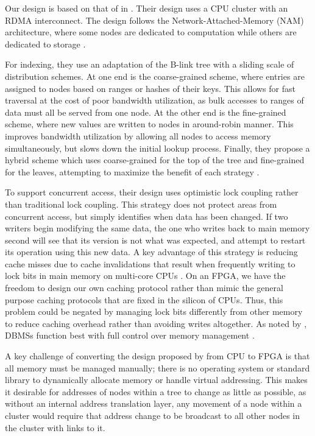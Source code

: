 

Our design is based on that of \citeauthor{base} in . Their
design uses a CPU cluster with an RDMA interconnect. The design follows the
Network-Attached-Memory (NAM) architecture, where some nodes are dedicated to
computation while others are dedicated to storage
\autocite{base,binnig-vldb-2016}.

For indexing, they use an adaptation of the B-link tree with a sliding scale of
distribution schemes. At one end is the coarse-grained scheme, where entries are
assigned to nodes based on ranges or hashes of their keys. This allows for fast
traversal at the cost of poor bandwidth utilization, as bulk accesses to ranges
of data must all be served from one node. At the other end is the fine-grained
scheme, where new values are written to nodes in around-robin manner. This
improves bandwidth utilization by allowing all nodes to access memory
simultaneously, but slows down the initial lookup process. Finally, they propose
a hybrid scheme which uses coarse-grained for the top of the tree and
fine-grained for the leaves, attempting to maximize the benefit of each strategy
\autocite{base}.

To support concurrent access, their design uses optimistic lock coupling rather
than traditional lock coupling. This strategy does not protect areas from
concurrent access, but simply identifies when data has been changed. If two
writers begin modifying the same data, the one who writes back to main memory
second will see that its version is not what was expected, and attempt to
restart its operation using this new data. A key advantage of this strategy is
reducing cache misses due to cache invalidations that result when frequently
writing to lock bits in main memory on multi-core CPUs
\autocite{leis-damon-2016}. On an FPGA, we have the freedom to design our own
caching protocol rather than mimic the general purpose caching protocols that
are fixed in the silicon of CPUs. Thus, this problem could be negated by
managing lock bits differently from other memory to reduce caching overhead
rather than avoiding writes altogether. As noted by
\citeauthor{binnig-vldb-2016}, DBMSs function best with full control over memory
management \autocite{binnig-vldb-2016}.



A key challenge of converting the design proposed by \citeauthor{base} from CPU
to FPGA is that all memory must be managed manually; there is no operating
system or standard library to dynamically allocate memory or handle virtual
addressing. This makes it desirable for addresses of nodes within a tree to
change as little as possible, as without an internal address translation layer,
any movement of a node within a cluster would require that address change to be
broadcast to all other nodes in the cluster with links to it.

